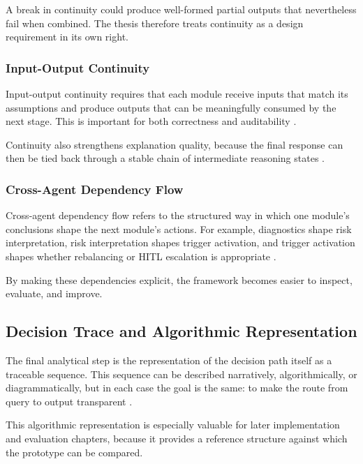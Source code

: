 \documentclass[11pt]{article}
\begin{document}
A break in continuity could produce well-formed partial outputs that nevertheless fail when combined. The thesis therefore treats continuity as a design requirement in its own right.

\subsubsection{Input-Output Continuity}
Input-output continuity requires that each module receive inputs that match its assumptions and produce outputs that can be meaningfully consumed by the next stage. This is important for both correctness and auditability \cite{hamilton2017,jennings1998}.

Continuity also strengthens explanation quality, because the final response can then be tied back through a stable chain of intermediate reasoning states \cite{lundberg2017,arrieta2020}.

\subsubsection{Cross-Agent Dependency Flow}
Cross-agent dependency flow refers to the structured way in which one module's conclusions shape the next module's actions. For example, diagnostics shape risk interpretation, risk interpretation shapes trigger activation, and trigger activation shapes whether rebalancing or HITL escalation is appropriate \cite{wooldridge2009,amershi2014}.

By making these dependencies explicit, the framework becomes easier to inspect, evaluate, and improve.

\subsection{Decision Trace and Algorithmic Representation}
The final analytical step is the representation of the decision path itself as a traceable sequence. This sequence can be described narratively, algorithmically, or diagrammatically, but in each case the goal is the same: to make the route from query to output transparent \cite{white2000,hayesroth1985}.

This algorithmic representation is especially valuable for later implementation and evaluation chapters, because it provides a reference structure against which the prototype can be compared.
\end{document}
